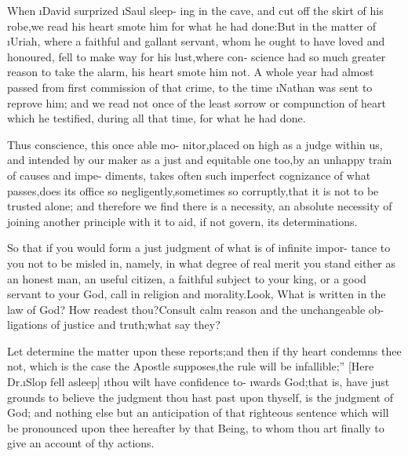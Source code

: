 \documentclass[twoside]{article}
\begin{document}
\lqq When \i{David} surprized \i{Saul} sleep-\break
\lqq ing in the cave, and cut off the skirt\break
\lqq of his robe,\tsk we read his heart smote\break
\lqq him for what he had done:\tsk But in\break
\lqq the matter of \i{Uriah}, where a faithful\break
\lqq and gallant servant, whom he ought\break
\lqq to have loved and honoured, fell to\break
\lqq make way for his lust,\tsk where con-
\lqq science had so much greater reason to\break
\lqq take the alarm, his heart smote him\break
\lqq not.  A whole year had almost passed\break
\lqq from first commission of that crime,\break
\lqq to the time \i{Nathan} was sent to reprove\break
\lqq him; and we read not once of the least\break
\lqq sorrow or compunction of heart which\break
\lqq he testified, during all that time, for\break
\lqq what he had done.

\lqq Thus conscience, this once able mo-\break
\lqq nitor,\tsh placed on high as a judge\break
\lqq within us, and intended by our maker\break
\lqq as a just and equitable one too,\tsk by\break
\lqq an unhappy train of causes and impe-\break
\lqq diments, takes often such imperfect\break
\lqq cognizance of what passes,\tsh does its\break
\lqq office so negligently,\tsh sometimes so\break
\lqq corruptly,\tsk that it is not to be trusted\break
\lqq alone; and therefore we find there is\break
\lqq a necessity, an absolute necessity of
\lqq joining another principle with it to aid,\break
\lqq if not govern, its determinations.

\lqq So that if you would form a just\break
\lqq judgment of what is of infinite impor-\break
\lqq tance to you not to be misled in,\tsh\break
\lqq namely, in what degree of real merit\break
\lqq you stand either as an honest man, an\break
\lqq useful citizen, a faithful subject to your\break
\lqq king, or a good servant to your God,\tsk\break
\lqq call in religion and morality.\tsk Look,\break
\lqq \tsk What is written in the law of God?\break
\lqq \tsh How readest thou?\tsh Consult\break
\lqq calm reason and the unchangeable ob-\break
\lqq ligations of justice and truth;\tsk what\break
\lqq say they?

\lqq Let  determine the\break
\lqq matter upon these reports;\tsk and then\break
\lqq if thy heart condemns thee not, which\break
\lqq is the case the Apostle supposes,\tsh the
\lqq rule will be infallible;” [Here Dr.\@ \i{Slop}\break
fell asleep] \lqq \i{thou wilt have confidence to-}\break
\lqq \i{wards God};\tsk that is, have just grounds\break
\lqq to believe the judgment thou hast past\break
\lqq upon thyself, is the judgment of God;\break
\lqq and nothing else but an anticipation\break
\lqq of that righteous sentence which will\break
\lqq be pronounced upon thee hereafter by\break
\lqq that Being, to whom thou art finally\break
\lqq to give an account of thy actions.
\end{document}
